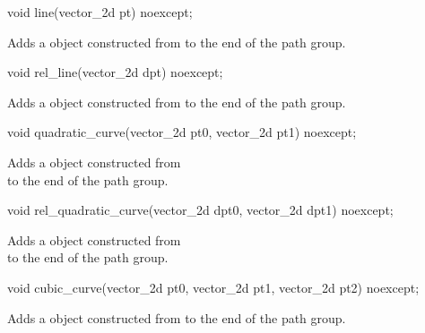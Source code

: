 %
\begin{itemdecl}
void line(vector_2d pt) noexcept;
\end{itemdecl}
\begin{itemdescr}
\pnum
Adds a  object constructed from  to the end of the path group.
\end{itemdescr}

%
\begin{itemdecl}
void rel_line(vector_2d dpt) noexcept;
\end{itemdecl}
\begin{itemdescr}
\pnum
\effects
Adds a  object constructed from  to the end of the path group.
\end{itemdescr}

%
\begin{itemdecl}
void quadratic_curve(vector_2d pt0, vector_2d pt1) noexcept;
\end{itemdecl}
\begin{itemdescr}
\pnum
\effects
Adds a  object constructed from\\  to the end of the path group.
\end{itemdescr}

%
\begin{itemdecl}
void rel_quadratic_curve(vector_2d dpt0, vector_2d dpt1)
  noexcept;
\end{itemdecl}
\begin{itemdescr}
\pnum
\effects
Adds a  object constructed from\\  to the end of the path group.
\end{itemdescr}

%
\begin{itemdecl}
void cubic_curve(vector_2d pt0, vector_2d pt1,
  vector_2d pt2) noexcept;
\end{itemdecl}
\begin{itemdescr}
\pnum
\effects
\pnum
Adds a  object constructed from  to the end of the path group.
\end{itemdescr}

